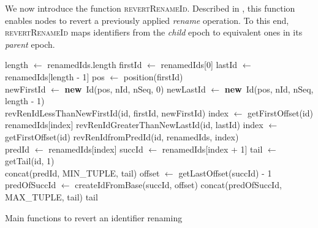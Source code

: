\documentclass[10pt,journal,compsoc]{IEEEtran}
\let\MYoriglatexcaption\caption
\renewcommand{\caption}[2][\relax]{\MYoriglatexcaption[#2]{#2}}
\newcommand{\new}{\textbf{new}}
\begin{document}
\label{sec:reverting-rename-ops}

We now introduce the function \textsc{revertRenameId}.
Described in , this function enables nodes to revert a previously applied \emph{rename} operation.
To this end, \textsc{revertRenameId} maps identifiers from the \emph{child} epoch to equivalent ones in its \emph{parent} epoch.

\begin{myalgorithm}[!ht]
    \footnotesize
    \begin{algorithmic}
            \State length $\gets$ renamedIds.length
            \State firstId $\gets$ renamedIds[0]
            \State lastId $\gets$ renamedIds[length - 1]
            \State pos $\gets$ position(firstId)
            \\
            \State newFirstId $\gets$ \new~Id(pos, nId, nSeq, 0)
            \State newLastId $\gets$ \new~Id(pos, nId, nSeq, length - 1)
            \\
                \State \Return revRenIdLessThanNewFirstId(id, firstId, newFirstId)
                \State index $\gets$ getFirstOffset(id)
                \State \Return renamedIds[index]
                \State \Return revRenIdGreaterThanNewLastId(id, lastId)
            \Else
                \State index $\gets$ getFirstOffset(id)
                \State \Return revRenIdfromPredId(id, renamedIds, index)
            \EndIf
        \EndFunction
        \\
            \State predId $\gets$ renamedIds[index]
            \State succId $\gets$ renamedIds[index + 1]
            \State tail $\gets$ getTail(id, 1)
            \\
                \State {}
                \State \Return concat(predId, MIN\_TUPLE, tail)
                \State {}
                \State offset $\gets$ getLastOffset(succId) - 1
                \State predOfSuccId $\gets$ createIdFromBase(succId, offset)
                \State \Return concat(predOfSuccId, MAX\_TUPLE, tail)
            \Else
                \State \Return tail
            \EndIf
        \EndFunction
    \end{algorithmic}
    \caption{Main functions to revert an identifier renaming}
    \label{alg:revertRenameId}
\end{myalgorithm}
\end{document}
